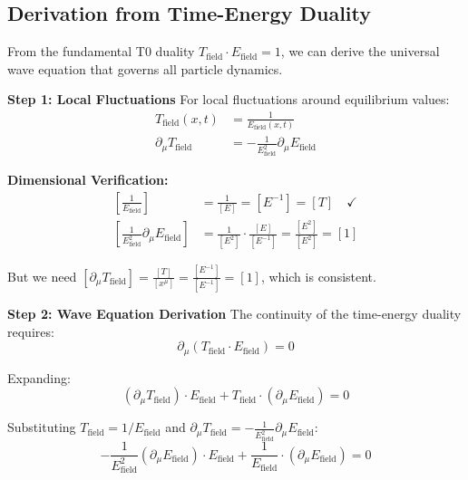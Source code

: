 \documentclass[12pt,a4paper]{report}
\begin{document}
	\subsection{Derivation from Time-Energy Duality}
	\label{subsec:derivation_wave_equation}
	
	From the fundamental T0 duality $T_{\text{field}} \cdot E_{\text{field}} = 1$, we can derive the universal wave equation that governs all particle dynamics.
	
	\textbf{Step 1: Local Fluctuations}
	For local fluctuations around equilibrium values:
	\begin{align}
		T_{\text{field}}(x,t) &= \frac{1}{E_{\text{field}}(x,t)} \\
		\partial_\mu T_{\text{field}} &= -\frac{1}{E_{\text{field}}^2} \partial_\mu E_{\text{field}}
	\end{align}
	
	\textbf{Dimensional Verification:}
	\begin{align}
		\left[\frac{1}{E_{\text{field}}}\right] &= \frac{1}{[E]} = [E^{-1}] = [T] \quad \checkmark \\
		\left[\frac{1}{E_{\text{field}}^2} \partial_\mu E_{\text{field}}\right] &= \frac{1}{[E^2]} \cdot \frac{[E]}{[E^{-1}]} = \frac{[E^2]}{[E^2]} = [1]
	\end{align}
	
	But we need $[\partial_\mu T_{\text{field}}] = \frac{[T]}{[x^\mu]} = \frac{[E^{-1}]}{[E^{-1}]} = [1]$, which is consistent.
	
	\textbf{Step 2: Wave Equation Derivation}
	The continuity of the time-energy duality requires:
	\begin{equation}
		\partial_\mu(T_{\text{field}} \cdot E_{\text{field}}) = 0
	\end{equation}
	
	Expanding:
	\begin{equation}
		(\partial_\mu T_{\text{field}}) \cdot E_{\text{field}} + T_{\text{field}} \cdot (\partial_\mu E_{\text{field}}) = 0
	\end{equation}
	
	Substituting $T_{\text{field}} = 1/E_{\text{field}}$ and $\partial_\mu T_{\text{field}} = -\frac{1}{E_{\text{field}}^2} \partial_\mu E_{\text{field}}$:
	\begin{equation}
		-\frac{1}{E_{\text{field}}^2} (\partial_\mu E_{\text{field}}) \cdot E_{\text{field}} + \frac{1}{E_{\text{field}}} \cdot (\partial_\mu E_{\text{field}}) = 0
	\end{equation}
	
\end{document}
